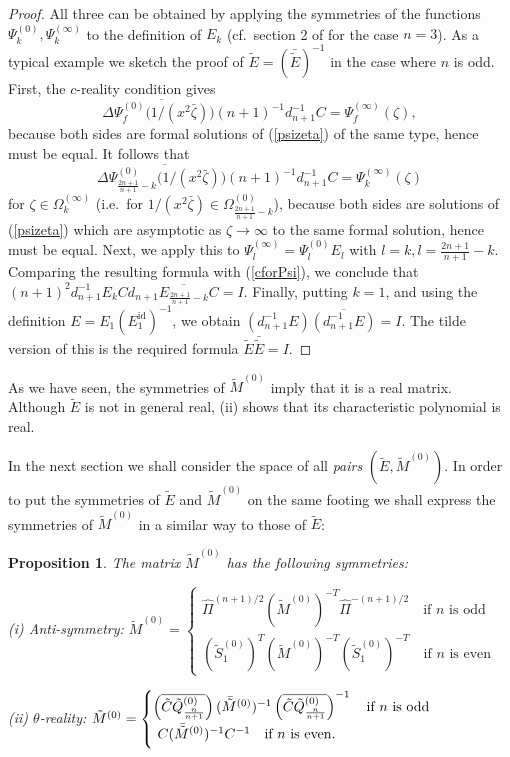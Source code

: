 \documentclass[a4paper,12pt,leqno]{amsart}
\numberwithin{equation}{section}
\theoremstyle{plain}
\newtheorem{proposition}[theorem]{Proposition}
\theoremstyle{definition}
\newcommand{\Om}{\Omega}
\newcommand{\De}{\Delta}
\newcommand{\ze}{\zeta}
\DeclareMathOperator{\id}{id}
\newcommand{\Psiz}{  \Psi^{(0)}  }
\newcommand{\Psii}{  \Psi^{(\infty)}  }
\newcommand{\Omz}{  \Om^{(0)}  }
\newcommand{\Omi}{  \Om^{(\infty)}  }
\newcommand{\tSz}{  \tilde S^{(0)}  }
\newcommand{\tQz}{  \tilde Q^{(0)}  }
\newcommand{\tE}{  \tilde E  }
\newcommand{\tMz}{  \tilde M^{(0)}  }
\begin{document}
\begin{proof}
All three can be obtained by applying
the symmetries of the functions $\Psiz_k,\Psii_k$ to the definition of $E_k$
(cf.\ section 2 of \cite{GIL2} for the case $n=3$).
As a typical example we sketch the proof of $\tilde E = (\bar{\tilde E})^{-1}$ in the case where $n$ is odd.
First, the $c$-reality condition gives
\[
\De \overline{\Psiz_f(1/(x^2\bar\ze)})(n+1)^{-1}d_{n+1}^{-1}C  = \Psii_f(\ze),
\]
because both sides are formal solutions of (\ref{psizeta}) of the same type,
hence must be equal.
It follows that
\begin{equation}\label{cforPsi}
\De \overline{\Psiz_{\scriptstyle\frac{2n+1}{n+1}-k}(1/(x^2\bar\ze)})(n+1)^{-1}d_{n+1}^{-1}C  = \Psii_k(\ze)
\end{equation}
for $\ze\in\Omi_k$ (i.e.\ for $1/(x^2\bar\ze)\in\Omz_{\scriptstyle\frac{2n+1}{n+1}-k}$),
because both sides are solutions of (\ref{psizeta}) which are asymptotic as $\ze\to\infty$ to
the same formal solution,
hence must be equal.  Next, we apply this to $\Psii_l=\Psiz_l E_l$ with
$l=k, l=\scriptstyle\frac{2n+1}{n+1}-k$.
Comparing the resulting formula with (\ref{cforPsi}), we conclude that
$(n+1)^2 d_{n+1}^{-1} E_k C d_{n+1} \overline{ E_{\scriptstyle\frac{2n+1}{n+1}-k} } C = I$.
Finally, putting $k=1$, and using the definition $E=E_1 (E_1^{\id})^{-1}$,
we obtain
$(d_{n+1}^{-1}E) \overline{(d_{n+1}^{-1}E)}=I$. The tilde version of this is
the required formula
$\tilde E \bar{\tilde E} =I$.
\end{proof}

As we have seen, the symmetries of $\tMz$ imply that it is a real matrix.
Although $\tE$ is
not in general real, (ii) shows that its characteristic polynomial is real.

In the next section we shall consider the space of all {\em pairs} $(\tE,\tMz)$. In
order to put the symmetries of $\tE$ and $\tMz$ on the same footing we shall express
the symmetries of $\tMz$ in a similar way to those of $\tE$:

\begin{proposition}\label{basesymmetries}
The matrix $\tMz$ has the following symmetries:

\noindent (i) Anti-symmetry:
$
\tMz=
\begin{cases}
\hat\Pi^{(n+1)/2}  (\tMz)^{-T}  \hat\Pi^{-(n+1)/2} \quad\text{if $n$ is odd}
\\
(\tSz_1)^T  (\tMz)^{-T}  (\tSz_1)^{-T}  \quad\text{if $n$ is even}
\end{cases}
$

\noindent (ii) $\theta$-reality:
$
\tMz=
\begin{cases}
\left(
\overline{\tilde C\tQz_{ {\scriptstyle\frac{n}{n+1}}  } }
\right)
(\bar {\tilde M}^{(0)})^{-1}
\left(
\overline{\tilde C\tQz_{ {\scriptstyle\frac{n}{n+1}}  } }
\right)^{-1}
\quad\text{if $n$ is odd}
\\
\vphantom{  \dfrac12  }
\ C
(\bar {\tilde M}^{(0)})^{-1}
C^{-1}
\quad\text{if $n$ is even.}
\end{cases}
$
\end{proposition}
\end{document}
